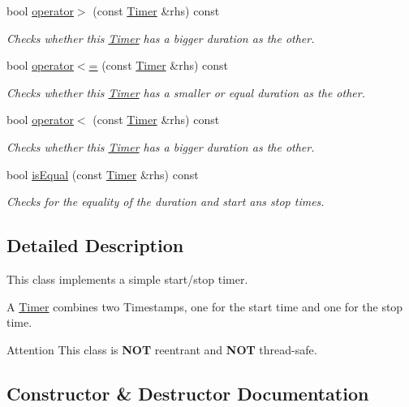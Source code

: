 \begin{DoxyCompactItemize}
bool \hyperlink{class_timer_ae8654e7d8f21f31eef1af32d81380ff5}{operator$>$} (const \hyperlink{class_timer}{Timer} \&rhs) const 
\begin{DoxyCompactList}\small\item\em Checks whether this \hyperlink{class_timer}{Timer} has a bigger duration as the other. \end{DoxyCompactList}\item 
bool \hyperlink{class_timer_a49d50769cf2aac1c3684bca31da707b1}{operator$<$=} (const \hyperlink{class_timer}{Timer} \&rhs) const 
\begin{DoxyCompactList}\small\item\em Checks whether this \hyperlink{class_timer}{Timer} has a smaller or equal duration as the other. \end{DoxyCompactList}\item 
bool \hyperlink{class_timer_af2d482584aebf42cd7ce8d4199ac80ad}{operator$<$} (const \hyperlink{class_timer}{Timer} \&rhs) const 
\begin{DoxyCompactList}\small\item\em Checks whether this \hyperlink{class_timer}{Timer} has a bigger duration as the other. \end{DoxyCompactList}\item 
bool \hyperlink{class_timer_ad48f2139d1a9196bd5e152d0faa59cfb}{is\+Equal} (const \hyperlink{class_timer}{Timer} \&rhs) const 
\begin{DoxyCompactList}\small\item\em Checks for the equality of the duration and start ans stop times. \end{DoxyCompactList}\end{DoxyCompactItemize}


\subsection{Detailed Description}
This class implements a simple start/stop timer. 

A \hyperlink{class_timer}{Timer} combines two Timestamps, one for the start time and one for the stop time.

\begin{DoxyAttention}{Attention}
This class is {\bfseries N\+O\+T} reentrant and {\bfseries N\+O\+T} thread-\/safe. 
\end{DoxyAttention}


\subsection{Constructor \& Destructor Documentation}
\hypertarget{class_timer_a5f16e8da27d2a5a5242dead46de05d97}{}
